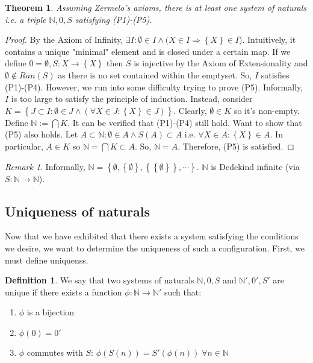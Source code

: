\documentclass{article}
\newcommand\N{\ensuremath{\mathbb{N}}}
\renewcommand\O{\ensuremath{\emptyset}}
\newtheorem{theorem}{Theorem}[section]
\theoremstyle{definition}
\newtheorem{definition}{Definition}[subsection]
\theoremstyle{remark}
\newtheorem*{remark}{Remark}
\theoremstyle{plain}
\begin{document}
\begin{theorem}
    Assuming Zermelo's axioms, there is at least one system of naturals i.e. a triple 
    \(\N, 0, S\) satisfying (P1)-(P5).
\end{theorem}
\begin{proof}
    By the Axiom of Infinity, \(\exists I: \O \in I \land (X \in I \Rightarrow \left\{ X \right\} \in I \)). 
    Intuitively, it contains a unique "minimal" element and is closed under a certain map. If we define 
    \(0 = \O, S: X \to \left\{ X \right\}\) then \(S\) is injective by the Axiom of Extensionality and \(\O \notin Ran(S)\) 
    as there is no set contained within the emptyset. So, \(I\) satisfies (P1)-(P4). However, we run into some difficulty 
    trying to prove (P5). Informally, \(I\) is too large to satisfy the principle of induction. Instead, consider 
    \(K = \left\{ J \subset I: \O \in J \land (\forall X \in J: \left\{ X \right\} \in J) \right\}\).  Clearly, \(\O \in K\) so it's non-empty. 
    Define \(\N := \bigcap K\). It can be verified that (P1)-(P4) still hold. Want to show that (P5) also holds. Let \(A\subset \N: \O \in A \land S(A)\subset A\) i.e. \(\forall X\in A: \left\{ X \right\} \in A\). 
    In particular, \(A \in K\) so \(\N = \bigcap K \subset A\). So, \(\N = A\). Therefore, (P5) is satisfied. 
\end{proof}

\begin{remark}
    Informally, \(\N = \left\{  \O, \left\{ \O \right\}, \left\{ \left\{ \O \right\} \right\}, \cdots \right\}\). \(\N\) is Dedekind infinite (via \(S: \N \to \N\)).
\end{remark}

\subsection{Uniqueness of naturals}

Now that we have exhibited that there exists a system satisfying the conditions we desire, we want to determine the uniqueness of such a configuration. 
First, we must define uniquenss. 

\begin{definition}
    We say that two systems of naturals \(\N, 0, S\) and \(\N', 0', S'\) are unique if there exists a function \(\phi : \N \to \N' \) such that:
    \begin{enumerate}
        \item \(\phi\) is a bijection 
        \item \(\phi(0) = 0'\)
        \item \(\phi\) commutes with \(S\): \(\phi(S(n)) = S'(\phi(n)) \; \forall n \in \N\)
    \end{enumerate}
\end{definition}
\end{document}
